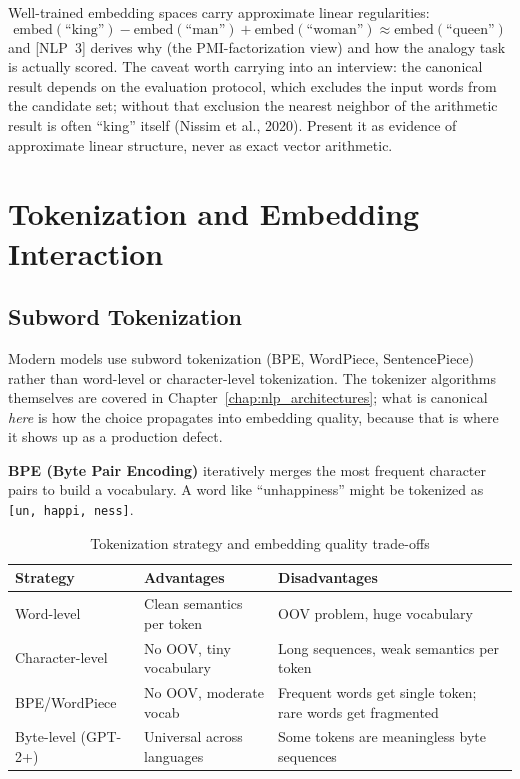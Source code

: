Well-trained embedding spaces carry approximate linear regularities:
\begin{equation}
\text{embed}(\text{``king''}) - \text{embed}(\text{``man''}) + \text{embed}(\text{``woman''}) \approx \text{embed}(\text{``queen''})
\end{equation}
and [NLP~3] derives why (the PMI-factorization view) and how the analogy task is actually scored. The caveat worth carrying into an interview: the canonical result depends on the evaluation protocol, which excludes the input words from the candidate set; without that exclusion the nearest neighbor of the arithmetic result is often ``king'' itself (Nissim et al., 2020). Present it as evidence of approximate linear structure, never as exact vector arithmetic.

\section{Tokenization and Embedding Interaction}
\label{sec:tokenization_embedding}

\subsection{Subword Tokenization}

Modern models use subword tokenization (BPE, WordPiece, SentencePiece) rather than word-level or character-level tokenization. The tokenizer algorithms themselves are covered in Chapter~\ref{chap:nlp_architectures}; what is canonical \emph{here} is how the choice propagates into embedding quality, because that is where it shows up as a production defect.

\textbf{BPE (Byte Pair Encoding)} iteratively merges the most frequent character pairs to build a vocabulary. A word like ``unhappiness'' might be tokenized as \texttt{[un, happi, ness]}.

\begin{table}[H]
\centering
\caption{Tokenization strategy and embedding quality trade-offs}
\begin{tabularx}{\textwidth}{lXX}
\toprule
\textbf{Strategy} & \textbf{Advantages} & \textbf{Disadvantages} \\
\midrule
Word-level & Clean semantics per token & OOV problem, huge vocabulary \\
Character-level & No OOV, tiny vocabulary & Long sequences, weak semantics per token \\
BPE/WordPiece & No OOV, moderate vocab & Frequent words get single token; rare words get fragmented \\
Byte-level (GPT-2+) & Universal across languages & Some tokens are meaningless byte sequences \\
\bottomrule
\end{tabularx}
\end{table}

